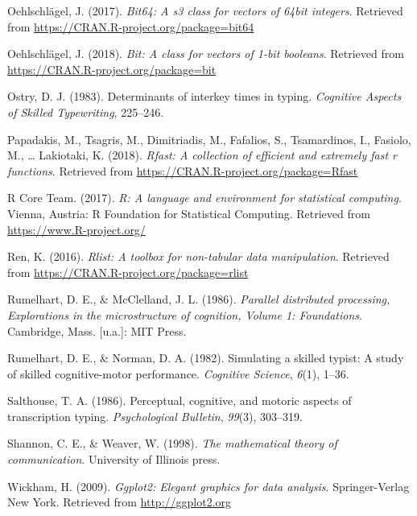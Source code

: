 \documentclass[floatsintext,man]{apa6}
\theoremstyle{definition}
\theoremstyle{definition}
\theoremstyle{definition}
\theoremstyle{remark}
\begin{document}
\hypertarget{ref-R-bit64}{}
Oehlschlägel, J. (2017). \emph{Bit64: A s3 class for vectors of 64bit
integers}. Retrieved from \url{https://CRAN.R-project.org/package=bit64}

\hypertarget{ref-R-bit}{}
Oehlschlägel, J. (2018). \emph{Bit: A class for vectors of 1-bit
booleans}. Retrieved from \url{https://CRAN.R-project.org/package=bit}

\hypertarget{ref-OstryDeterminantsinterkeytimes1983}{}
Ostry, D. J. (1983). Determinants of interkey times in typing.
\emph{Cognitive Aspects of Skilled Typewriting}, 225--246.

\hypertarget{ref-R-Rfast}{}
Papadakis, M., Tsagris, M., Dimitriadis, M., Fafalios, S., Tsamardinos,
I., Fasiolo, M., \ldots{} Lakiotaki, K. (2018). \emph{Rfast: A
collection of efficient and extremely fast r functions}. Retrieved from
\url{https://CRAN.R-project.org/package=Rfast}

\hypertarget{ref-R-base}{}
R Core Team. (2017). \emph{R: A language and environment for statistical
computing}. Vienna, Austria: R Foundation for Statistical Computing.
Retrieved from \url{https://www.R-project.org/}

\hypertarget{ref-R-rlist}{}
Ren, K. (2016). \emph{Rlist: A toolbox for non-tabular data
manipulation}. Retrieved from
\url{https://CRAN.R-project.org/package=rlist}

\hypertarget{ref-rumelhart_parallel_1986}{}
Rumelhart, D. E., \& McClelland, J. L. (1986). \emph{Parallel
distributed processing, Explorations in the microstructure of cognition,
Volume 1: Foundations}. Cambridge, Mass. {[}u.a.{]}: MIT Press.

\hypertarget{ref-RumelhartSimulatingskilledtypist1982}{}
Rumelhart, D. E., \& Norman, D. A. (1982). Simulating a skilled typist:
A study of skilled cognitive-motor performance. \emph{Cognitive
Science}, \emph{6}(1), 1--36.

\hypertarget{ref-salthouse_perceptual_1986}{}
Salthouse, T. A. (1986). Perceptual, cognitive, and motoric aspects of
transcription typing. \emph{Psychological Bulletin}, \emph{99}(3),
303--319.

\hypertarget{ref-Shannonmathematicaltheorycommunication1998}{}
Shannon, C. E., \& Weaver, W. (1998). \emph{The mathematical theory of
communication}. University of Illinois press.

\hypertarget{ref-R-ggplot2}{}
Wickham, H. (2009). \emph{Ggplot2: Elegant graphics for data analysis}.
Springer-Verlag New York. Retrieved from \url{http://ggplot2.org}
\end{document}

